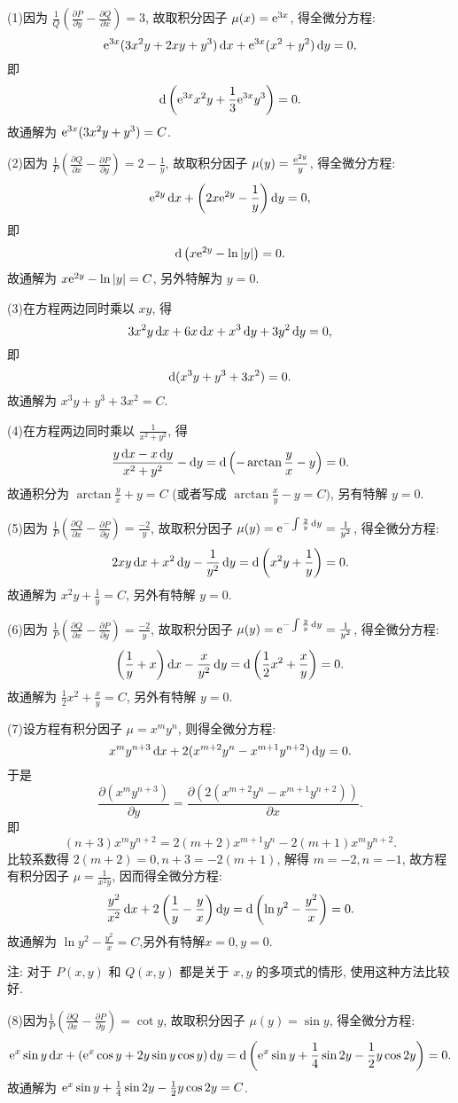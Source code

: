\begin{solution}
  (1)因为 $\frac{1}{Q}\left(\frac{\partial P}{\partial y}-\frac{\partial Q}{\partial x}\right)=3$,
  故取积分因子 $\mu(x)=\mathrm{e}^{3x}$, 得全微分方程:
  \[\mathrm{e}^{3x}(3x^2y+2xy+y^3)\mathop{}\!\mathrm{d} x+\mathrm{e}^{3x}(x^2+y^2)\mathop{}\!\mathrm{d} y=0,\]
  即
  \[\mathop{}\!\mathrm{d}\left(\mathrm{e}^{3x}x^2y+\frac{1}{3}\mathrm{e}^{3x}y^3\right) = 0.\]
  故通解为 $\mathrm{e}^{3x}(3x^2y+y^3)=C$.

  (2)因为 $\frac{1}{P}\left(\frac{\partial Q}{\partial x}-\frac{\partial P}{\partial y}\right)=2-\frac{1}{y}$, 故取积分因子 $\mu(y)=\frac{\mathrm{e}^{2y}}{y}$, 得全微分方程:
  \[\mathrm{e}^{2y}\mathop{}\!\mathrm{d} x+\left(2x\mathrm{e}^{2y}-\frac{1}{y}\right)\mathop{}\!\mathrm{d} y=0,\]
  即
  \[\mathop{}\!\mathrm{d}\left(x\mathrm{e}^{2y}-\ln|y|\right)=0.\]
  故通解为 $x\mathrm{e}^{2y}-\ln|y|=C$, 另外特解为 $y=0$.

  (3)在方程两边同时乘以 $xy$, 得
  \[3x^2y\mathop{}\!\mathrm{d} x+6x\mathop{}\!\mathrm{d} x+x^3\mathop{}\!\mathrm{d} y+3y^2\mathop{}\!\mathrm{d} y=0,\]
  即
  \[\mathop{}\!\mathrm{d}(x^3y+y^3+3x^2)=0.\]
  故通解为 $x^3y+y^3+3x^2=C$.

  (4)在方程两边同时乘以 $\frac{1}{x^2+y^2}$, 得
  \[\frac{y\mathop{}\!\mathrm{d} x-x\mathop{}\!\mathrm{d} y}{x^2+y^2}-\mathop{}\!\mathrm{d} y=\mathop{}\!\mathrm{d}\left(-\arctan\frac{y}{x}-y\right)=0.\]
  故通积分为 $\arctan\frac{y}{x}+y=C$ (或者写成 $\arctan\frac{x}{y}-y=C)$, 另有特解 $y=0$.

  (5)因为 $\frac{1}{P}\left(\frac{\partial Q}{\partial x}-\frac{\partial P}{\partial y}\right)=\frac{-2}{y}$,
  故取积分因子 $\mu(y)=\mathrm{e}^{-\int\frac{2}{y}\mathop{}\!\mathrm{d} y}=\frac{1}{y^2}$, 得全微分方程:
  \[2xy\mathop{}\!\mathrm{d} x+x^2\mathop{}\!\mathrm{d} y-\frac{1}{y^2}\mathop{}\!\mathrm{d} y=\mathop{}\!\mathrm{d}\left(x^2y+\frac{1}{y}\right)=0.\]
  故通解为 $x^2y+\frac{1}{y}=C$, 另外有特解 $y=0$.

  (6)因为 $\frac{1}{P}\left(\frac{\partial Q}{\partial x}-\frac{\partial P}{\partial y}\right)=\frac{-2}{y}$,
  故取积分因子 $\mu(y)=\mathrm{e}^{-\int\frac{2}{y}\mathop{}\!\mathrm{d} y}=\frac{1}{y^2}$, 得全微分方程:
  \[\left(\frac{1}{y}+x\right)\mathop{}\!\mathrm{d} x-\frac{x}{y^2}\mathop{}\!\mathrm{d} y
    = \mathop{}\!\mathrm{d}\left(\frac{1}{2}x^2+\frac{x}{y}\right)=0.\]
  故通解为 $\frac{1}{2}x^2+\frac{x}{y}=C$, 另外有特解 $y=0$.

  (7)设方程有积分因子 $\mu=x^my^n$, 则得全微分方程:
  \[x^my^{n+3}\mathop{}\!\mathrm{d} x+2(x^{m+2}y^n-x^{m+1}y^{n+2})\mathop{}\!\mathrm{d} y=0.\]
  于是
  \[\frac{\partial\left(x^my^{n+3}\right)}{\partial y}
    = \frac{\partial\left(2\left(x^{m+2}y^n-x^{m+1}y^{n+2}\right)\right)}{\partial x}.\]
  即
  \[(n+3)x^my^{n+2}=2(m+2)x^{m+1}y^n-2(m+1)x^my^{n+2}.\]
  比较系数得 $2(m+2)=0,n+3=-2(m+1)$, 解得 $m=-2,n=-1$,
  故方程有积分因子 $\mu=\frac{1}{x^2y}$, 因而得全微分方程:
  \[\frac{y^2}{x^2}\mathop{}\!\mathrm{d} x+2\left(\frac{1}{y}-\frac{y}{x}\right)\mathop{}\!\mathrm{d} y
    =\mathop{}\!\mathrm{d}\left(\ln y^2-\frac{y^2}{x}\right)=0.\]
  故通解为 $\ln y^2-\frac{y^2}{x}=C$,另外有特解$x=0,y=0$.

  注: 对于 $P(x,y)$ 和 $Q(x,y)$ 都是关于 $x,y$ 的多项式的情形, 使用这种方法比较好.

  (8)因为$\frac{1}{P}\left(\frac{\partial Q}{\partial x}-\frac{\partial P}{\partial y}\right)=\cot y$,
  故取积分因子 $\mu(y)=\sin y$, 得全微分方程:
  \[\mathrm{e}^x\sin y\mathop{}\!\mathrm{d} x+\left(\mathrm{e}^x\cos y+2y\sin y\cos y\right)\mathop{}\!\mathrm{d} y
    = \mathop{}\!\mathrm{d}\left(\mathrm{e}^x\sin y+\frac{1}{4}\sin2y-\frac{1}{2}y\cos2y\right)=0.\]
  故通解为 $\mathrm{e}^x\sin y+\frac{1}{4}\sin2y-\frac{1}{2}y\cos2y=C$.
\end{solution}



